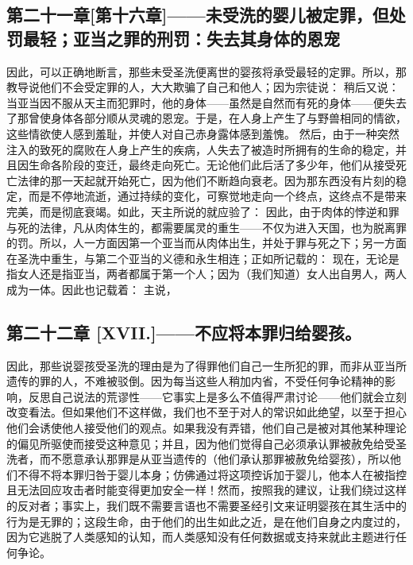 
\subsection{第二十一章[第十六章]——未受洗的婴儿被定罪，但处罚最轻；亚当之罪的刑罚：失去其身体的恩宠}

因此，可以正确地断言，那些未受圣洗便离世的婴孩将承受最轻的定罪。所以，那教导说他们不会受定罪的人，大大欺骗了自己和他人；因为宗徒说：  稍后又说：  当亚当因不服从天主而犯罪时，他的身体——虽然是自然而有死的身体——便失去了那曾使身体各部分顺从灵魂的恩宠。于是，在人身上产生了与野兽相同的情欲，这些情欲使人感到羞耻，并使人对自己赤身露体感到羞愧。 然后，由于一种突然注入的致死的腐败在人身上产生的疾病，人失去了被造时所拥有的生命的稳定，并且因生命各阶段的变迁，最终走向死亡。无论他们此后活了多少年，他们从接受死亡法律的那一天起就开始死亡，因为他们不断趋向衰老。因为那东西没有片刻的稳定，而是不停地流逝，通过持续的变化，可察觉地走向一个终点，这终点不是带来完美，而是彻底衰竭。如此，天主所说的就应验了：  因此，由于肉体的悖逆和罪与死的法律，凡从肉体生的，都需要属灵的重生——不仅为进入天国，也为脱离罪的罚。所以，人一方面因第一个亚当而从肉体出生，并处于罪与死之下；另一方面在圣洗中重生，与第二个亚当的义德和永生相连；正如所记载的：  现在，无论是指女人还是指亚当，两者都属于第一个人；因为（我们知道）女人出自男人，两人成为一体。因此也记载着： 主说， \par


\subsection{第二十二章 [XVII.]——不应将本罪归给婴孩。}

因此，那些说婴孩受圣洗的理由是为了得罪他们自己一生所犯的罪，而非从亚当所遗传的罪的人，不难被驳倒。因为每当这些人稍加内省，不受任何争论精神的影响，反思自己说法的荒谬性——它事实上是多么不值得严肃讨论——他们就会立刻改变看法。但如果他们不这样做，我们也不至于对人的常识如此绝望，以至于担心他们会诱使他人接受他们的观点。如果我没有弄错，他们自己是被对其他某种理论的偏见所驱使而接受这种意见；并且，因为他们觉得自己必须承认罪被赦免给受圣洗者，而不愿意承认那罪是从亚当遗传的（他们承认那罪被赦免给婴孩），所以他们不得不将本罪归咎于婴儿本身；仿佛通过将这项控诉加于婴儿，他本人在被指控且无法回应攻击者时能变得更加安全一样！然而，按照我的建议，让我们绕过这样的反对者；事实上，我们既不需要言语也不需要圣经引文来证明婴孩在其生活中的行为是无罪的；这段生命，由于他们的出生如此之近，是在他们自身之内度过的，因为它逃脱了人类感知的认知，而人类感知没有任何数据或支持来就此主题进行任何争论。\par

